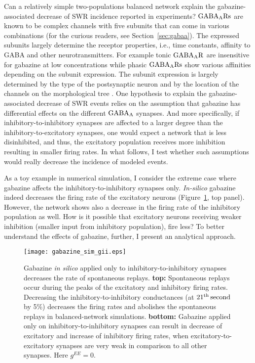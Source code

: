     Can a relatively simple two-populations balanced network explain the
    gabazine-associated decrease of SWR incidence reported in experiments?
    $\rm GABA_A Rs$ are known to be complex channels
    with five subunits that can come in various combinations (for the curious
    readers, see Section~\ref{sec:gabaa}). The expressed subunits largely
    determine the receptor properties, i.e., time constants, affinity to GABA
    and other neurotransmitters. For example tonic $\rm GABA_A R$ are
    insensitive for gabazine \citep{Bai2001, Yeung2003, Behrens2007} at low
    concentrations while phasic $\rm GABA_A Rs$ show various affinities
    depending on the subunit expression. The subunit expression is largely
    determined by the type of the postsynaptic neuron and by the location of
    the channels on the morphological tree \citep{Sieghart2002}. One hypothesis
    to explain the gabazine-associated decrease of SWR events relies on the
    assumption that gabazine has differential effects on the different $\rm
    GABA_A$ synapses. And more specifically, if inhibitory-to-inhibitory
    synapses are affected to a larger degree than the inhibitory-to-excitatory
    synapses, one would expect a network that is less disinhibited, and thus,
    the excitatory population receives more inhibition resulting in smaller
    firing rates. In what follows, I test whether such assumptions would really
    decrease the incidence of modeled events.

    As a toy example in numerical simulation, I consider the extreme case where
    gabazine affects the inhibitory-to-inhibitory synapses only. \textit{
    In-silico} gabazine indeed decreases the firing rate of the excitatory
    neurons (Figure~\ref{fig:gabazine_sim_giionly}, top panel). However, the network shows
    also a decrease in the firing rate of the inhibitory population as well.
    How is it possible that excitatory neurons receiving weaker inhibition
    (smaller input from inhibitory population), fire less? To better understand
    the effects of gabazine, further, I present an analytical approach.
    
    \begin{figure}
      \center
      \texttt{[image: gabazine\_sim\_gii.eps]}
      \caption{
        Gabazine \textit{in silico} applied only to inhibitory-to-inhibitory
        synapses decreases the rate of spontaneous replays. \textbf{top:}
        Spontaneous replays occur during the peaks of the excitatory and
        inhibitory firing rates. Decreasing the inhibitory-to-inhibitory
        conductances (at $21^{\rm th}\, \rm second$ by 5\%) decreases the
        firing rates and abolishes the spontaneous replays in balanced-network
        simulations. \textbf{bottom:} Gabazine applied only on
        inhibitory-to-inhibitory synapses can result in decrease of excitatory
        and increase of inhibitory firing rates, when excitatory-to-excitatory
        synapses are very weak in comparison to all other synapses. Here
        $g^{EE}=0$.
      }
    \label{fig:gabazine_sim_giionly}
    \end{figure}

